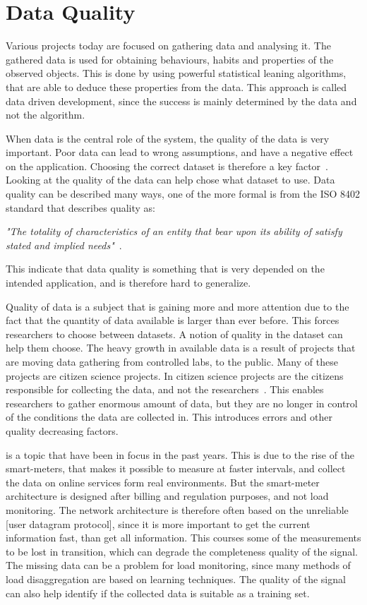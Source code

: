 \chapter{Data Quality}
\label{Sec:DataQuality}
Various projects today are focused on gathering data and analysing it. The gathered data is used for obtaining behaviours, habits and properties of the observed objects. This is done by using powerful statistical leaning algorithms, that are able to deduce these properties from the data. This approach is called data driven development, since the success is mainly determined by the data and not the algorithm. 

When data is the central role of the system, the quality of the data is very important. Poor data can lead to wrong assumptions, and have a negative effect on the application. Choosing the correct dataset is therefore a key factor~\cite{RefWorks:3}. Looking at the quality of the data can help chose what dataset to use. Data quality can be described many ways, one of the more formal is from the ISO 8402 standard that describes quality as: 

\begin{adjustwidth}{2.5em}{2.5em}
\emph{"The totality of characteristics of an entity that bear upon its ability of satisfy stated and implied needs"}~\cite{RefWorks:5}.
\end{adjustwidth}

This indicate that data quality is something that is very depended on the intended application, and is therefore hard to generalize. 

Quality of data is a subject that is gaining more and more attention due to the fact that the quantity of data available is larger than ever before. This forces researchers to choose between datasets. A notion of quality in the dataset can help them choose. The heavy growth in available data is a result of projects that are moving data gathering from controlled labs, to the public. Many of these projects are citizen science projects. In citizen science projects are the citizens responsible for collecting the data, and not the researchers~\cite{RefWorks:2}. This enables researchers to gather enormous amount of data, but they are no longer in control of the conditions the data are collected in. This introduces errors and other quality decreasing factors. 

 is a topic that have been in focus in the past years. This is due to the rise of the smart-meters, that makes it possible to measure at faster intervals, and collect the data on online services form real environments. But the smart-meter architecture is designed after billing and regulation purposes, and not load monitoring. The network architecture is therefore often based on the unreliable [user datagram protocol], since it is more important to get the current information fast, than get all information. This courses some of the measurements to be lost in transition, which can degrade the completeness quality of the signal. The missing data can be a problem for load monitoring, since many methods of load disaggregation are based on learning techniques. The quality of the signal can also help identify if the collected data is suitable as a training set. 


